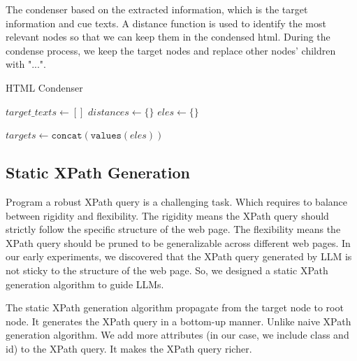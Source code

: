 \documentclass[a4paper]{article}
\begin{document}
The condenser based on the extracted information, which is the target information and cue texts. A distance function is used to identify the most relevant nodes so that we can keep them in the condensed html. During the condense process, we keep the target nodes and replace other nodes' children with "...".

\begin{algorithm}
  \SetAlgoLined
  \caption{HTML Condenser}
  \label{alg:condenser}
  
  $target\_texts \gets []$\;
  $distances \gets \{\}$\;
  $eles \gets \{\}$\;
  

  $targets \gets \texttt{concat}(\texttt{values}(eles))$\;

\end{algorithm}

\subsection{Static XPath Generation}

Program a robust XPath query is a challenging task. Which requires to balance between rigidity and flexibility. The rigidity means the XPath query should strictly follow the specific structure of the web page. The flexibility means the XPath query should be pruned to be generalizable across different web pages. In our early experiments, we discovered that the XPath query generated by LLM is not sticky to the structure of the web page. So, we designed a static XPath generation algorithm to guide LLMs.

The static XPath generation algorithm propagate from the target node to root node. It generates the XPath query in a bottom-up manner. Unlike naive XPath generation algorithm. We add more attributes (in our case, we include class and id) to the XPath query. It makes the XPath query richer.
\end{document}
